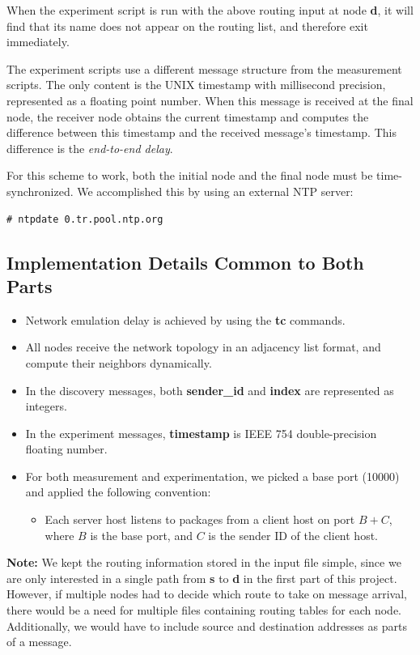 \documentclass[conference]{IEEEtran}
\begin{document}
When the experiment script is run with the above routing input at node \textbf{d}, it will find
that its name does not appear on the routing list, and therefore exit immediately.

The experiment scripts use a different message structure from the measurement scripts. The only
content is the UNIX timestamp with millisecond precision, represented as a floating point number.
When this message is received at the final node, the receiver node obtains the current timestamp and
computes the difference between this timestamp and the received message's timestamp. This
difference is the \textit{end-to-end delay}.

For this scheme to work, both the initial node and the final node must be time-synchronized. We
accomplished this by using an external NTP server:

\begin{lstlisting}
# ntpdate 0.tr.pool.ntp.org
\end{lstlisting}

\subsection{Implementation Details Common to Both Parts}
\begin{itemize}
    \item Network emulation delay is achieved by using the \textbf{tc} commands.
    \item All nodes receive the network topology in an adjacency list format, and compute their neighbors dynamically.
    \item In the discovery messages, both \textbf{sender\_id} and \textbf{index} are represented as integers.
    \item In the experiment messages, \textbf{timestamp} is IEEE 754 double-precision floating number.
    \item For both measurement and experimentation, we picked a base port (10000) and applied the following convention:
    \begin{itemize}
        \item Each server host listens to packages from a client host on port $B + C$, where $B$ is the base port, and $C$ is the sender ID of the client host.
    \end{itemize}
\end{itemize}

\textbf{Note:} We kept the routing information stored in the input file simple, since we are only interested in a single path
from \textbf{s} to \textbf{d} in the first part of this project. However, if multiple nodes had to decide which route to
take on message arrival, there would be a need for multiple files containing routing tables for each node. Additionally,
we would have to include source and destination addresses as parts of a message.
\end{document}
